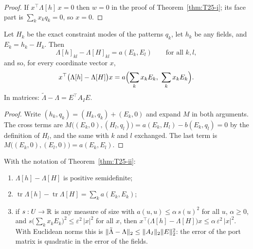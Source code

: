 \begin{proof}
  \leanok
  If $x^\top\Lambda[h]\,x=0$ then $w=0$ in the proof of
  Theorem~\ref{thm:T25-i}; its face part is $\sum_kx_kq_k=0$, so $x=0$.
\end{proof}

\begin{theorem}\label{thm:T25-ii}
  \leanok
  Let $H_k$ be the exact constraint modes of the patterns $q_k$, let $h_k$ be
  any fields, and $E_k=h_k-H_k$.  Then
  \[
    \Lambda[h]_{kl}-\Lambda[H]_{kl}=a(E_k,E_l)\qquad\text{for all }k,l,
  \]
  and so, for every coordinate vector $x$,
  \[
    x^\top\bigl(\Lambda[h]-\Lambda[H]\bigr)x
      =a\Bigl(\sum_kx_kE_k,\ \sum_kx_kE_k\Bigr).
  \]
  In matrices: $\tilde\Lambda-\Lambda=E^\top A_IE$.
\end{theorem}

\begin{proof}
  \leanok
  Write $(h_k,q_k)=(H_k,q_k)+(E_k,0)$ and expand $M$ in both arguments.  The
  cross terms are $M\bigl((E_k,0),(H_l,q_l)\bigr)=a(E_k,H_l)-b(E_k,q_l)=0$ by
  the definition of $H_l$, and the same with $k$ and $l$ exchanged.  The last
  term is $M\bigl((E_k,0),(E_l,0)\bigr)=a(E_k,E_l)$.
\end{proof}

\begin{corollary}[T25 (ii), consequences]\label{cor:T25-ii}
  \leanok
  With the notation of Theorem~\ref{thm:T25-ii}:
  \begin{enumerate}
    \item $\Lambda[h]-\Lambda[H]$ is positive semidefinite;
    \item $\operatorname{tr}\Lambda[h]-\operatorname{tr}\Lambda[H]=\sum_ka(E_k,E_k)$;
    \item if $s:U\to\mathbb{R}$ is any measure of size with $a(u,u)\le\alpha\,s(u)^2$
      for all $u$, $\alpha\ge0$, and
      $s\bigl(\sum_kx_kE_k\bigr)^2\le\varepsilon^2\,|x|^2$ for all $x$, then
      $x^\top\bigl(\Lambda[h]-\Lambda[H]\bigr)x\le\alpha\,\varepsilon^2\,|x|^2$.
      With Euclidean norms this is
      $\lVert \tilde\Lambda-\Lambda\rVert_2\le\lVert A_I\rVert_2\lVert E\rVert_2^2$: the error of
      the port matrix is quadratic in the error of the fields.
  \end{enumerate}
\end{corollary}

